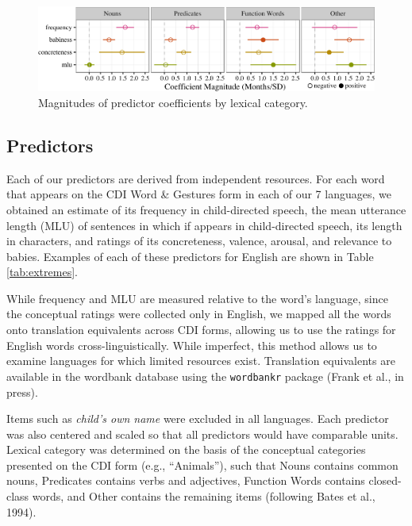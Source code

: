 \documentclass[10pt, letterpaper]{article}
\newenvironment{CodeChunk}{}{}
\begin{document}
\begin{CodeChunk}
\begin{figure}[tb]

{\centering \includegraphics{figs/coefs_lexcat-1} 

}

\caption[Magnitudes of predictor coefficients by lexical category]{Magnitudes of predictor coefficients by lexical category.}\label{fig:coefs_lexcat}
\end{figure}
\end{CodeChunk}

\subsection{Predictors}\label{predictors}

Each of our predictors are derived from independent resources. For each
word that appears on the CDI Word \& Gestures form in each of our 7
languages, we obtained an estimate of its frequency in child-directed
speech, the mean utterance length (MLU) of sentences in which if appears
in child-directed speech, its length in characters, and ratings of its
concreteness, valence, arousal, and relevance to babies. Examples of
each of these predictors for English are shown in Table
\ref{tab:extremes}.

While frequency and MLU are measured relative to the word's language,
since the conceptual ratings were collected only in English, we mapped
all the words onto translation equivalents across CDI forms, allowing us
to use the ratings for English words cross-linguistically. While
imperfect, this method allows us to examine languages for which limited
resources exist. Translation equivalents are available in the wordbank
database using the \texttt{wordbankr} package (Frank et al., in press).

Items such as \emph{child's own name} were excluded in all languages.
Each predictor was also centered and scaled so that all predictors would
have comparable units. Lexical category was determined on the basis of
the conceptual categories presented on the CDI form (e.g., ``Animals''),
such that Nouns contains common nouns, Predicates contains verbs and
adjectives, Function Words contains closed-class words, and Other
contains the remaining items (following Bates et al., 1994).
\end{document}
